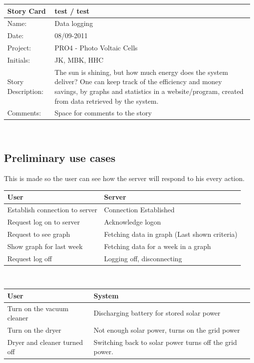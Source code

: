 \documentclass[12pt,a4paper]{report}
\begin{document}
\begin{tabular}{|l|p{12cm}|}
\hline Story Card & test / test \\ 
\hline Name: & Data logging \\ 
\hline Date: & 08/09-2011 \\ 
\hline Project: & PRO4 - Photo Voltaic Cells \\ 
\hline Initials: & JK, MBK, HHC \\ 
\hline Story Description: & The sun is shining, but how much energy does the system deliver? One can keep track of the efficiency and money savings, by graphs and statistics in a website/program, created from data retrieved by the system. \\ 
\hline Comments: & Space for comments to the story \\ 
\hline 
\end{tabular} \\


\subsection{Preliminary use cases}
This is made so the user can see how the server will respond to his every action.


\begin{tabular}{|l|l|}
\hline \textbf{User} & \textbf{Server}\\
\hline Establish connection to server & Connection Established\\
\hline Request log on to server & Acknowledge logon\\
\hline Request to see graph & Fetching data in graph (Last shown criteria)\\
\hline Show graph for last week & Fetching data for a week in a graph\\
\hline Request log off & Logging off, disconnecting\\
\hline
\end{tabular} 
\\
\begin{tabular}{|l|l|}
\hline \textbf{User} & \textbf{System}\\
\hline Turn on the vacuum cleaner & Discharging battery for stored solar power\\
\hline Turn on the dryer & Not enough solar power, turns on the grid power\\
\hline Dryer and cleaner turned off & Switching back to solar power turns off the grid power.\\
\hline
\end{tabular} 
\end{document}
